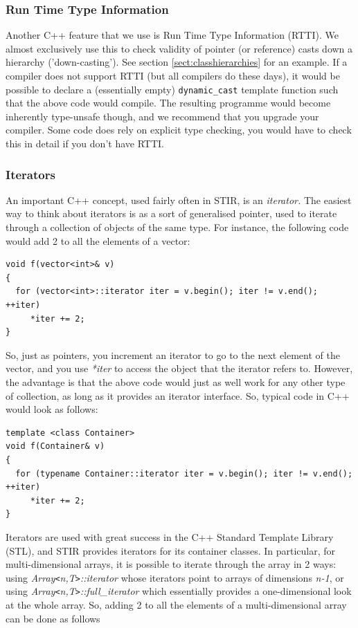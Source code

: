 \documentclass{article}
\begin{document}
\subsubsection{Run Time Type Information}
Another C++ feature that we use is Run Time Type 
Information (RTTI). We almost exclusively use this to check validity 
of pointer (or reference) casts down a hierarchy ('down-casting'). 
See section \ref{sect:classhierarchies} 
for an example. If a compiler does not support 
RTTI (but all compilers do these days), it would be possible to declare 
a (essentially empty) \texttt{dynamic\_cast} 
template function such that the above code would compile. The 
resulting programme would become inherently type-unsafe though, 
and we recommend that you upgrade your compiler. Some code does 
rely on explicit type checking, you would have to check this 
in detail if you don't have RTTI.

\subsubsection{
Iterators}

An important C++ concept, used fairly often in STIR, is an \textit{iterator.} The 
easiest way to think about iterators is as a sort of generalised 
pointer, used to iterate through a collection of objects of the 
same type. For instance, the following code would add 2 to all 
the elements of a vector:

\begin{verbatim}
void f(vector<int>& v)
{
  for (vector<int>::iterator iter = v.begin(); iter != v.end(); ++iter)
     *iter += 2;
}
\end{verbatim}


So, just as pointers, you increment an iterator to go to the 
next element of the vector, and you use \textit{*iter} to access the 
object that the iterator refers to. However, the advantage is 
that the above code would just as well work for any other type 
of collection, as long as it provides an iterator interface. 
So, typical code in C++ would look as follows:

\begin{verbatim}
template <class Container>
void f(Container& v)
{
  for (typename Container::iterator iter = v.begin(); iter != v.end(); ++iter)
     *iter += 2;
}
\end{verbatim}


Iterators are used with great success in the C++ Standard Template 
Library (STL), and STIR provides iterators for its container 
classes. In particular, for multi-dimensional arrays, it is possible 
to iterate through the array in 2 ways: using \textit{Array\texttt{<}n,T\texttt{>}::iterator} 
whose iterators point to arrays of dimensions \textit{n-1}, or using \textit{Array\texttt{<}n,T\texttt{>}::full\_iterator} which 
essentially provides a one-dimensional look at the whole array. 
So, adding 2 to all the elements of a multi-dimensional array 
can be done as follows
\end{document}
